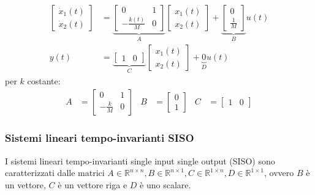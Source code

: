 \documentclass{article}
\begin{document}
\begin{align*}
    \begin{bmatrix}
        \dot x_1(t)\\
        \dot x_2(t)
    \end{bmatrix}
    &=
    \underbrace{\begin{bmatrix}
        0 & 1\\
        -\frac{k(t)}{M} & 0
    \end{bmatrix}}_{A}
    \begin{bmatrix}
        x_1(t)\\
        x_2(t)
    \end{bmatrix}
    +
    \underbrace{\begin{bmatrix}
        0\\
        \frac{1}{M}
    \end{bmatrix}}_{B}
    u(t)
    \\
    y(t) &= 
    \underbrace{\begin{bmatrix}
        1 & 0
    \end{bmatrix}}_{C}
    \begin{bmatrix}
        x_1(t)\\
        x_2(t)
    \end{bmatrix}
    + \underbrace{0}_D u(t)
\end{align*}
per $k$ costante:
\begin{align*}
    A &= \begin{bmatrix}
        0 & 1\\
        - \frac{k}{M} & 0
    \end{bmatrix}
    &
    B &= 
    \begin{bmatrix}
        0\\
        1
    \end{bmatrix}
    &
    C &= 
    \begin{bmatrix}
        1 & 0
    \end{bmatrix}
\end{align*}


\subsubsection{Sistemi lineari tempo-invarianti SISO}
I sistemi lineari tempo-invarianti single input single output (SISO) sono caratterizzati dalle matrici $A \in \mathbb{R}^{n \times n} , B \in \mathbb{R}^{n \times 1}, C \in \mathbb{R}^{1 \times n} , D \in \mathbb{R}^{1 \times 1}$, ovvero $B$ è un vettore, $C$ è un vettore riga e $D$ è uno scalare.
\end{document}
